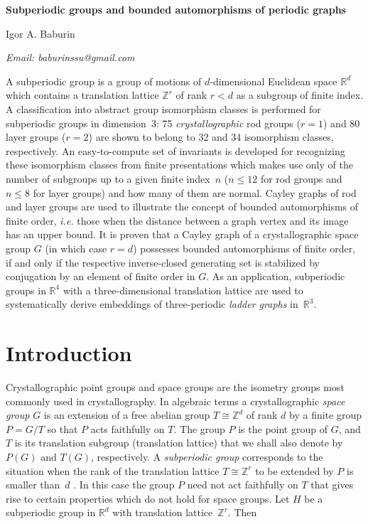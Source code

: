 \documentclass[11pt,a4paper]{article}
\newcommand{\Z}{\mathbb Z}
\newcommand{\R}{\mathbb R}
\begin{document}
\bigskip
\bigskip

\centerline{\large \textbf{Subperiodic groups and bounded automorphisms of periodic graphs}}

\bigskip
\bigskip

\centerline{\large Igor A. Baburin}
\centerline{\emph{Email: baburinssu@gmail.com}}

\bigskip

\noindent A subperiodic group is a group of motions of $d$-dimensional Euclidean space $\R^d$ which contains a translation lattice $\Z^r$ of rank $r < d$ as a subgroup of finite index. A classification into abstract group isomorphism classes is performed for subperiodic groups in dimension~3: 75 \emph{crystallographic} rod groups ($r=1$) and 80 layer groups ($r=2$) are shown to belong to 32 and 34 isomorphism classes, respectively. An easy-to-compute set of invariants is developed for recognizing these isomorphism classes from finite presentations which makes use only of the number of subgroups up to a given finite index~$n$ ($n \leq 12$ for rod groups and $n \leq 8$ for layer groups) and how many of them are normal. Cayley graphs of rod and layer groups are used to illustrate the concept of bounded automorphisms of finite order, \emph{i.e.} those when the distance between a graph vertex and its image has an upper bound. It is proven that a Cayley graph of a crystallographic space group $G$ (in which case $r=d$) possesses bounded automorphisms of finite order, if and only if the respective inverse-closed generating set is stabilized by conjugation by an element of finite order in $G$. As an application, subperiodic groups in $\R^4$ with a three-dimensional translation lattice are used to systematically derive embeddings of three-periodic \emph{ladder graphs} in~$\R^3$.

\section{Introduction}

\bigskip

Crystallographic point groups and space groups are the isometry groups most commonly used in crystallography. In algebraic terms a crystallographic \emph{space group} $G$ is an extension of a free abelian group $T \cong \Z^d$ of rank $d$ by a finite group $P = G/T$ so that $P$ acts faithfully on $T$. The group $P$ is the point group of $G$, and $T$ is its translation subgroup (translation lattice) that we shall also denote by $P(G)$ and $T(G)$, respectively. A \emph{subperiodic group} corresponds to the situation when the rank of the translation lattice $T \cong \Z^r$ to be extended by $P$ is smaller than~$d$ \cite{Koe80}. In this case the group $P$ need not act faithfully on $T$ that gives rise to certain properties which do not hold for space groups. Let $H$ be a subperiodic group in $\R^d$ with translation lattice~$\Z^r$. Then
\end{document}
